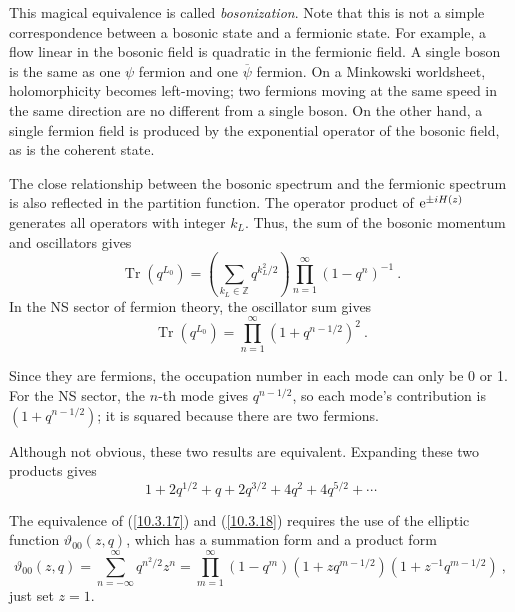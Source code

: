 	This magical equivalence is called \emph{bosonization}. Note that this is not a simple correspondence between a bosonic state and a fermionic state. For example, a flow linear in the bosonic field is quadratic in the fermionic field. A single boson is the same as one $\psi$ fermion and one $\overline{\psi}$ fermion. On a Minkowski worldsheet, holomorphicity becomes left-moving; two fermions moving at the same speed in the same direction are no different from a single boson. On the other hand, a single fermion field is produced by the exponential operator of the bosonic field, as is the coherent state.
	
	The close relationship between the bosonic spectrum and the fermionic spectrum is also reflected in the partition function. The operator product of $\mathrm{e}^{\pm i H(z)}$ generates all operators with integer $k_{L}$. Thus, the sum of the bosonic momentum and oscillators gives
	\begin{equation}
		\operatorname{Tr}(q^{L_{0}})=\left(\sum_{k_{L}\in\mathds{Z}}q^{k_{L}^{2}/2}\right)
		\prod_{n=1}^{\infty} (1-q^{n})^{-1}\:. \label{10.3.17}
	\end{equation}
	In the NS sector of fermion theory, the oscillator sum gives
	\begin{equation}
		\operatorname{Tr}(q^{L_{0}})=\prod_{n=1}^{\infty}(1+q^{n-1/2})^{2}\:. \label{10.3.18}
	\end{equation}
	\begin{tcolorbox}[breakable]
		Since they are fermions, the occupation number in each mode can only be 0 or 1. For the NS sector, the $n$-th mode gives $q^{n-1/2}$, so each mode's contribution is $(1+q^{n-1/2})$; it is squared because there are two fermions.
	\end{tcolorbox}
	Although not obvious, these two results are equivalent. Expanding these two products gives
	\begin{equation}
		1+2q^{1/2}+q+2q^{3/2}+4q^{2}+4q^{5/2} +\cdots \label{10.3.19}
	\end{equation}
	\begin{tcolorbox}[breakable]
		The equivalence of (\ref{10.3.17}) and (\ref{10.3.18}) requires the use of the elliptic function $\vartheta_{00}(z,q)$, which has a summation form and a product form
		\begin{equation*}
			\vartheta_{00}(z,q)=\sum_{n=-\infty}^{\infty}q^{n^{2}/2}z^{n} 
			=\prod_{m=1}^{\infty}(1-q^{m})(1+z q^{m-1/2})(1+z^{-1}q^{m-1/2})\:, 
		\end{equation*}
		just set $z=1$.
	\end{tcolorbox}
